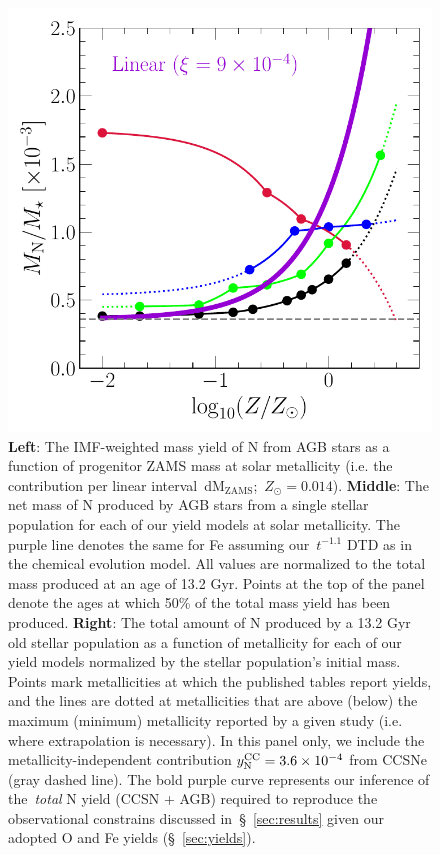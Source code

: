 \documentclass[ms.tex]{subfiles}
\begin{document}
\begin{figure}
\includegraphics[scale = 0.46]{ssp_production_metdep.pdf}
\caption{
\textbf{Left}: The IMF-weighted mass yield of N from AGB stars as a function of
progenitor ZAMS mass at solar metallicity (i.e. the contribution per linear
interval~dM$_\text{ZAMS}$;~$Z_\odot = 0.014$).
\textbf{Middle}: The net mass of N produced by AGB stars from a single stellar
population for each of our yield models at solar metallicity.
The purple line denotes the same for Fe assuming our~$t^{-1.1}$ DTD as in the
\citet{Johnson2021} chemical evolution model.
All values are normalized to the total mass produced at an age of 13.2 Gyr.
Points at the top of the panel denote the ages at which 50\% of the total mass
yield has been produced.
\textbf{Right}: The total amount of N produced by a 13.2 Gyr old stellar
population as a function of metallicity for each of our yield models normalized
by the stellar population's initial mass.
Points mark metallicities at which the published tables report yields, and the
lines are dotted at metallicities that are above (below) the maximum (minimum)
metallicity reported by a given study (i.e. where extrapolation is necessary).
In this panel only, we include the metallicity-independent contribution
$y_\text{N}^\text{CC} = 3.6\times10^{-4}$ from CCSNe (gray dashed line).
The bold purple curve represents our inference of the~\textit{total} N yield
(CCSN + AGB) required to reproduce the observational constrains discussed
in~\S~\ref{sec:results} given our adopted O and Fe yields (\S~\ref{sec:yields}).
}
\label{fig:ssp}
\end{figure}
\end{document}
